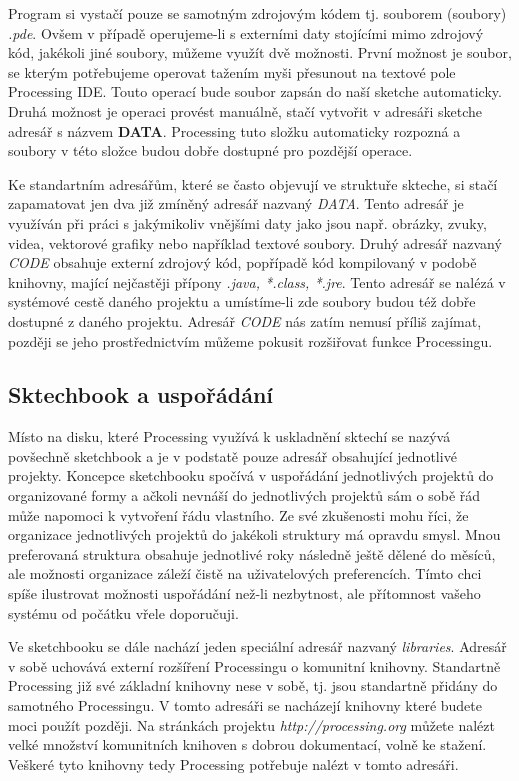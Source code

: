 \documentclass[12pt,twopage]{book}
\newcommand{\pododdil}[1]{\subsection{#1}\label{subsec:#1}}
\newcommand{\slovnik}[1]{\textbf{\gls{#1}}\index{#1}}
\begin{document}
Program si vystačí pouze se samotným zdrojovým kódem tj. souborem (soubory) {\em *.pde}. Ovšem v případě operujeme-li s externími daty stojícími mimo zdrojový kód, jakékoli jiné soubory, můžeme využít dvě možnosti. První možnost je soubor, se kterým potřebujeme operovat tažením myši přesunout na textové pole Processing IDE. Touto operací bude soubor zapsán do naší sketche automaticky. Druhá možnost je operaci provést manuálně, stačí vytvořit v adresáři sketche adresář s názvem \slovnik{DATA}. Processing tuto složku automaticky rozpozná a soubory v této složce budou dobře dostupné pro pozdější operace.

Ke standartním adresářům, které se často objevují ve struktuře skteche, si stačí zapamatovat jen dva již zmíněný adresář nazvaný {\em DATA}. Tento adresář je využíván při práci s jakýmikoliv vnějšími daty jako jsou např. obrázky, zvuky, videa, vektorové grafiky nebo například textové soubory. Druhý adresář nazvaný {\em CODE} obsahuje externí zdrojový kód, popřípadě kód kompilovaný v podobě knihovny, mající nejčastěji přípony {\em *.java, *.class, *.jre}. Tento adresář se nalézá v systémové cestě daného projektu a umístíme-li zde soubory budou též dobře dostupné z daného projektu. Adresář {\em CODE} nás zatím nemusí příliš zajímat, později se jeho prostřednictvím můžeme pokusit rozšiřovat funkce Processingu.


\pododdil{Sktechbook a uspořádání}

Místo na disku, které Processing využívá k uskladnění sktechí se nazývá povšechně sketchbook a je v podstatě pouze adresář obsahující jednotlivé projekty. Koncepce sketchbooku spočívá v uspořádání jednotlivých projektů do organizované formy a ačkoli nevnáší do jednotlivých projektů sám o sobě řád může napomoci k vytvoření řádu vlastního. Ze své zkušenosti mohu říci, že organizace jednotlivých projektů do jakékoli struktury má opravdu smysl. Mnou preferovaná struktura obsahuje jednotlivé roky následně ještě dělené do měsíců, ale možnosti organizace záleží čistě na uživatelových preferencích. Tímto chci spíše ilustrovat možnosti uspořádání než-li nezbytnost, ale přítomnost vašeho systému od počátku vřele doporučuji.

Ve sketchbooku se dále nachází jeden speciální adresář nazvaný {\em libraries}. Adresář v sobě uchovává externí rozšíření Processingu o komunitní knihovny. Standartně Processing již své základní knihovny nese v sobě, tj. jsou standartně přidány do samotného Processingu. V tomto adresáři se nacházejí knihovny které budete moci použít později. Na stránkách projektu {\em http://processing.org} můžete nalézt velké množství komunitních knihoven s dobrou dokumentací, volně ke stažení. Veškeré tyto knihovny tedy Processing potřebuje nalézt v tomto adresáři.
\end{document}
